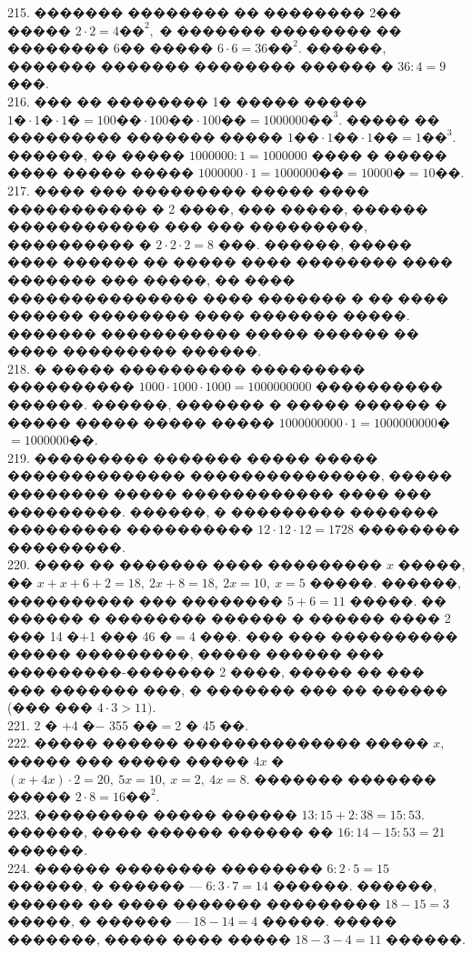 \documentclass[12pt]{article}
\begin{document}
215. ������� �������� �� �������� 2�� ����� $2\cdot2=4\text{��}^2,$ � ������� �������� �� �������� 6�� ����� $6\cdot6=36\text{��}^2.$ ������, ������� ������� �������� ������ � $36:4=9$ ���.\\
216. ��� �� �������� 1� ����� ����� $1\text{�}\cdot1\text{�}\cdot1\text{�}=100\text{��}\cdot100\text{��}\cdot100\text{��}=1000000\text{��}^3.$ ����� �� ��������� ������� ����� $1\text{��}\cdot1\text{��}\cdot1\text{��}=1\text{��}^3.$ ������, �� ����� $1000000:1=1000000$ ���� � ����� ���� ����� �����
$1000000\cdot1=1000000\text{��}=10000\text{�}=10$��.\\
217. ���� ��� ��������� ����� ���� ����������� � 2 ����, ��� �����, ������ ������������ ��� ��� ���������, ���������� � $2\cdot2\cdot2=8$ ���. ������, ����� ���� ������ �� ����� ���� �������� ���� ������� ��� �����, �� ���� ��������������� ���� ������� � �� ���� ������ �������� ���� ������� �����. ������� ����������� ����� ������ �� ���� ��������� ������.\\
218. � ����� ���������� ��������� ���������� $1000\cdot1000\cdot1000=1000000000$ ���������� ������. ������, ������� � ����� ������ � ����� ����� ����� ����� $1000000000\cdot1=1000000000$�$=1000000$��.\\
219. ��������� ������� ����� ����� �������������� ���������������, ����� �������� ����� ������������ ���� ��� ���������. ������, � ��������� ������� ��������� ���������� $12\cdot12\cdot12=1728$ �������� ���������.\\
220. ���� �� ������� ���� ��������� $x$ �����, ��  $x+x+6+2=18,\ 2x+8=18,\ 2x=10,\ x=5$ �����. ������, ���������� ��� �������� $5+6=11$ �����. �� ������ � �������� ������ � ������ ���� 2 ��� 14 �$+$1 ��� 46 �$=$4 ���. ��� ��� ���������� ����� ���������, ����� ������ ��� ���������-������� 2 ����, ����� �� ��� ��� ������� ���, � ������� ��� �� ������ (��� ��� $4\cdot3>11).$\\
221. 2 � $+$4 �$-$ 355 ��$=$2 � 45 ��.\\
222. ����� ������ �������������� ����� $x,$ ����� ��� ����� ����� $4x$ � $(x+4x)\cdot2=20,\ 5x=10,\ x=2,\ 4x=8.$ ������� ������� ����� $2\cdot8=16\text{��}^2.$\\
223. ��������� ����� ������ $13:15+2:38=15:53.$ ������, ���� ������ ������ �� $16:14-15:53=21$ ������.\\
224. ������ �������� �������� $6:2\cdot5=15$ ������, � ������ --- $6:3\cdot7=14$ ������. ������, ������ �� ���� ������� ��������� $18-15=3$ �����, � ������ --- $18-14=4$ �����. ����� �������, ����� ���� ����� $18-3-4=11$ ������.\\
\end{document}
